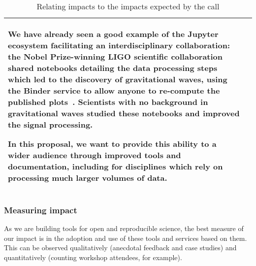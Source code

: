 \begin{table}[h!]
\begin{center}
\begin{tabular}{>{\raggedright}m{}|m{}}
        We have already seen a good example of the Jupyter ecosystem facilitating an
        interdisciplinary collaboration: the Nobel Prize-winning LIGO scientific collaboration shared
        notebooks detailing the data processing steps which led to the discovery of
        gravitational waves, using the Binder service to allow anyone to re-compute
        the published plots~\cite{ligo-open-science}. Scientists with no background in gravitational waves
        studied these notebooks and improved the signal processing.

        In this proposal, we want to provide this ability to a wider audience through
        improved tools and documentation,
        including for disciplines which rely on processing much larger volumes of
        data.\\
      \bottomrule
    \end{tabular}
  \end{center}
  \caption{Relating \TheProject impacts to the impacts expected by the call \label{table:impact-comparison}}
\end{table}


\subsubsection{Measuring impact}\label{sec:KPIs}

As we are building tools for open and reproducible science, the best measure of our impact
is in the adoption and use of these tools and services based on them. This can be observed
qualitatively (anecdotal feedback and case studies) and quantitatively (counting workshop
attendees, for example).\medskip


